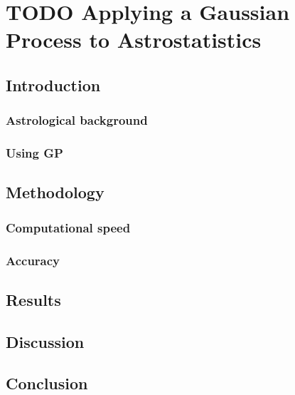 \section{TODO Applying a Gaussian Process to Astrostatistics}
% 
% 
% 
% 
% 
% 
% 
% 


\subsection{Introduction}

\subsubsection{Astrological background \cite{galxy-spectra-101}}

\subsubsection{Using GP \cite{galaxy-gp-noise}}

\subsection{Methodology}

\subsubsection{Computational speed}

\subsubsection{Accuracy}

\subsection{Results}

\subsection{Discussion}

\subsection{Conclusion}


